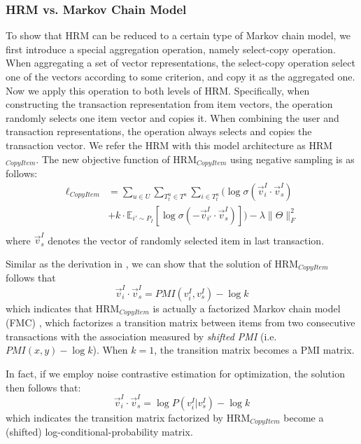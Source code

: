 \documentclass[10pt,journal,compsoc]{IEEEtran}
\begin{document}
\subsubsection{HRM vs. Markov Chain Model}
To show that HRM can be reduced to a certain type of Markov chain model, we first introduce a special aggregation operation, namely select-copy operation. When aggregating a set of vector representations, the select-copy operation select one of the vectors according to some criterion, and copy it as the aggregated one.
Now we apply this operation to both levels of HRM. Specifically, when constructing the transaction representation from item vectors, the operation randomly selects one item vector and copies it. When combining the user and transaction representations, the operation always selects and copies the transaction vector. We refer the HRM with this model architecture as HRM$_{CopyItem}$. The new objective function of HRM$_{CopyItem}$ using negative sampling is as follows:
\begin{displaymath}
    \begin{aligned}
  \ell_{CopyItem} &= \sum_{u\in U}\sum_{T^u_t\in T^u} \sum_{i\in T^u_t}\Big( \log\sigma(\vec{v}^I_i\cdot\vec{v}^I_s)\\
        &+k\cdot \mathbb{E}_{i'\sim P_I}[\log\sigma(-\vec{v}^I_{i'}\cdot\vec{v}^I_s)]\Big) -\lambda\|\Theta\|^2_F\\
   \end{aligned}
\end{displaymath}
where $\vec{v}^I_s$ denotes the vector of randomly selected item in last transaction.

Similar as the derivation in \cite{mikolov2014}, we can show that the solution of HRM$_{CopyItem}$ follows that
\begin{displaymath}
\vec{v}^I_i\cdot\vec{v}^I_s=PMI(v^I_i,v^I_s)-\log k
\end{displaymath}
which indicates that HRM$_{CopyItem}$ is actually a factorized Markov chain model (FMC) \cite{fpmc}, which factorizes a transition matrix between items from two consecutive transactions with the association measured by \textit{shifted PMI} (i.e.~$PMI(x,y)-\log k$). When $k=1$, the transition matrix becomes a PMI matrix.

In fact, if we employ noise contrastive estimation \cite{mikolov2013} for optimization, the solution then follows that:
\begin{displaymath}
\vec{v}^I_i\cdot\vec{v}^I_s=\log P(v^I_i|v^I_s)-\log k
\end{displaymath}
which indicates the transition matrix factorized by HRM$_{CopyItem}$ become a (shifted) log-conditional-probability matrix.
\end{document}
